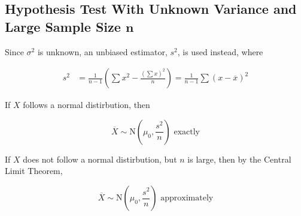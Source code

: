 \documentclass[11pt,a4paper]{book}
\begin{document}
\subsection{Hypothesis Test With Unknown Variance and Large Sample Size $\boldsymbol{n}$}

Since $\sigma^{2}$ is unknown, an unbiased estimator, $s^{2}$, is
used instead, where 

\begin{align*}
s^{2} & =\frac{1}{n-1}\left(\sum x^{2}-\frac{\left(\sum x\right)^{2}}{n}\right)=\frac{1}{n-1}\sum\left(x-\overline{x}\right)^{2}
\end{align*}

If $X$ follows a normal distirbution, then

\[
\overline{X}\sim\text{N}\left(\mu_{0},\frac{s^{2}}{n}\right)\text{ exactly}
\]

If $X$ does not follow a normal distirbution, but $n$ is large,
then by the Central Limit Theorem, 

\[
\overline{X}\sim\text{N}\left(\mu_{0},\frac{s^{2}}{n}\right)\text{ approximately}
\]
\end{document}
